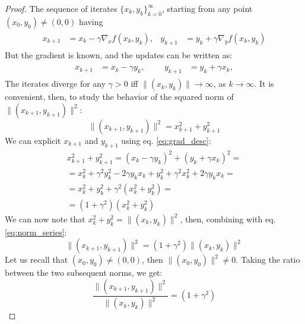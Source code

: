\documentclass[12pt]{article}
\begin{document}
\begin{proof}
The sequence of iterates $\{x_k, y_k\}^{\infty}_{k=0}$, starting from any point $(x_{0}, y_{0}) \neq (0, 0)$ having
\begin{align}
\begin{aligned}
    x_{k+1} &= x_{k} - \gamma \nabla_{x} f(x_{k}, y_{k}),  &  y_{k+1} &= y_{k} + \gamma \nabla_{y} f(x_{k}, y_{k})
\end{aligned}
\end{align}
But the gradient is known, and the updates can be written as:
\begin{align}
\begin{aligned} \label{eq:grad_desc}
    x_{k+1} &= x_{k} - \gamma y_{k}, \ \ \ \ \ \ \ &  y_{k+1} &= y_{k} + \gamma x_{k},
\end{aligned}
\end{align}
The iterates diverge for any $\gamma > 0$ iff $\lVert (x_{k}, y_{k}) \rVert \rightarrow \infty$, as $k \rightarrow \infty$. It is convenient, then, to study the behavior of the squared norm of $\lVert (x_{k+1}, y_{k+1}) \rVert ^ 2$:
\begin{equation}
    \lVert (x_{k+1}, y_{k+1}) \rVert ^ 2 = x_{k+1}^{2} + y_{k+1}^{2}
\end{equation}
We can explicit $x_{k+1}$ and $y_{k+1}$ using eq. \eqref{eq:grad_desc}:
\begin{gather}
    x_{k+1}^{2} + y_{k+1}^{2} = (x_{k} - \gamma y_{k})^{2} + (y_{k} + \gamma x_{k})^{2} = \nonumber \\
    = x_{k}^{2} + \gamma^{2} y^{2}_{k} - 2 \gamma y_{k} x_{k} + y_{k}^{2} + \gamma^{2} x^{2}_{k} + 2 \gamma y_{k} x_{k} = \nonumber \\
    = x_{k}^{2} + y_{k}^{2} + \gamma^{2} (x_{k}^{2} + y_{k}^{2}) = \nonumber \\
    = (1 + \gamma^{2}) (x_{k}^{2} + y_{k}^{2}) \label{eq:norm_series}
\end{gather}
We can now note that $x_{k}^{2} + y_{k}^{2} = \lVert (x_{k}, y_{k}) \rVert ^ 2$, then, combining with eq. \eqref{eq:norm_series}:
\begin{equation*}
    \lVert (x_{k+1}, y_{k+1}) \rVert ^ 2 = (1 + \gamma^{2}) \lVert (x_{k}, y_{k}) \rVert ^{2}
\end{equation*}
Let us recall that $(x_{0}, y_{0}) \neq (0, 0)$, then $\lVert (x_{0}, y_{0}) \rVert ^ 2 \neq 0$. Taking the ratio between the two subsequent norms, we get:
\begin{equation*}
    \frac{\lVert (x_{k+1}, y_{k+1}) \rVert ^ 2}{\lVert (x_{k}, y_{k}) \rVert ^{2}} = (1 + \gamma^{2})

\end{equation*}
\end{proof}
\end{document}
